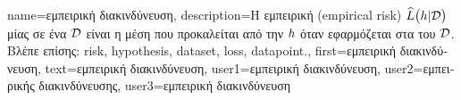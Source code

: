 {name={\foreignlanguage{greek}{εμπειρική διακινδύνευση}},
	description={\foreignlanguage{greek}{Η εμπειρική}  
		(empirical risk) $\widehat{L}\big(h|\mathcal{D}\big)$ \foreignlanguage{greek}{μίας}  
		\foreignlanguage{greek}{σε ένα}  $\mathcal{D}$ \foreignlanguage{greek}{είναι 
		η μέση}  \foreignlanguage{greek}{που προκαλείται από την 
  		$h$ όταν εφαρμόζεται στα}  \foreignlanguage{greek}{του} $\mathcal{D}$.
		\\
		\foreignlanguage{greek}{Βλέπε επίσης:} \gls{risk}, \gls{hypothesis}, \gls{dataset}, \gls{loss}, \gls{datapoint}.},
	first={\foreignlanguage{greek}{εμπειρική διακινδύνευση}},
	text={\foreignlanguage{greek}{εμπειρική διακινδύνευση}},
	user1={\foreignlanguage{greek}{εμπειρική διακινδύνευση}}, %
	user2={\foreignlanguage{greek}{εμπειρικής διακινδύνευσης}}, %
	user3={\foreignlanguage{greek}{εμπειρική διακινδύνευση}} %
}

